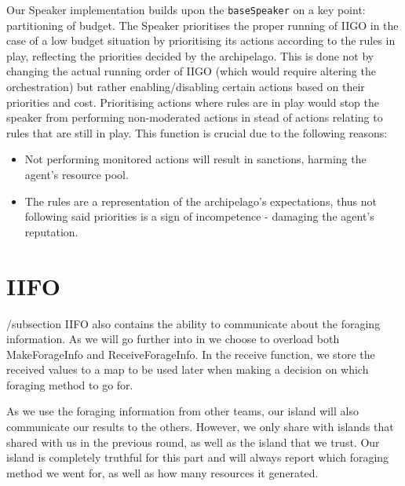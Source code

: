 Our Speaker implementation builds upon the \texttt{baseSpeaker} on a key point: partitioning of budget. The Speaker prioritises the proper running of IIGO in the case of a low budget situation by prioritising its actions according to the rules in play, reflecting the priorities decided by the archipelago. This is done not by changing the actual running order of IIGO (which would require altering the orchestration) but rather enabling/disabling certain actions based on their priorities and cost. Prioritising actions where rules are in play would stop the speaker from performing non-moderated actions in stead of actions relating to rules that are still in play. This function is crucial due to the following reasons:
\begin{itemize}
    \item Not performing monitored actions will result in sanctions, harming the agent's resource pool.
    \item The rules are a representation of the archipelago's expectations, thus not following said priorities is a sign of incompetence - damaging the agent's reputation.
\end{itemize}


\section{IIFO}\label{sec:IIFO}


/subsection{}
IIFO also contains the ability to communicate about the foraging information. As we will go further into in %
we choose to overload both MakeForageInfo and ReceiveForageInfo. In the receive function, we store the received values to a map to be used later when making a decision on which foraging method to go for. 

As we use the foraging information from other teams, our island will also communicate our results to the others. However, we only share with islands that shared with us in the previous round, as well as the island that we trust. Our island is completely truthful for this part and will always report which foraging method we went for, as well as how many resources it generated.

